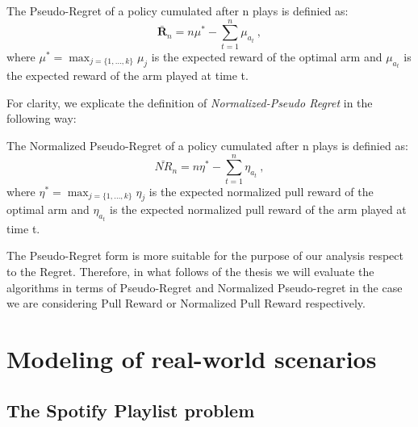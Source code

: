 \begin{definition}
	The Pseudo-Regret of a policy cumulated after n plays is definied as:
		$$\bm\bar{R}_{n}=n{\mu^{*}}- \sum_{t=1}^{n} \mu_{a_t} \ ,$$
	where  $\mu^{*}=\max_{j = \{1,\dots,k\}} \mu_j$ is the expected reward of the optimal arm and $\mu_{a_t}$ is the expected reward of the arm played at time t.
\end{definition}
For clarity, we explicate the definition of \emph{Normalized-Pseudo Regret} in the following way:
\begin{definition}
	The Normalized Pseudo-Regret of a policy cumulated after n plays is definied as:
	$$\bm\bar{\mathit{NR}}_{n}=n{\eta^{*}}- \sum_{t=1}^{n} \eta_{a_t} \ , $$
	where  $\eta^{*}=\max_{j = \{1,\dots,k\}} \eta_j$ is the expected normalized pull reward of the optimal arm and $\eta_{a_t}$ is the expected normalized pull reward of the arm played at time t.
\end{definition}



The Pseudo-Regret form is more suitable for the purpose of our analysis respect to the Regret. Therefore, in what follows of the thesis we will evaluate the algorithms in terms of Pseudo-Regret and Normalized Pseudo-regret in the case we are considering Pull Reward or Normalized Pull Reward respectively.



\section{Modeling of real-world scenarios}
\subsection{The Spotify Playlist problem}

